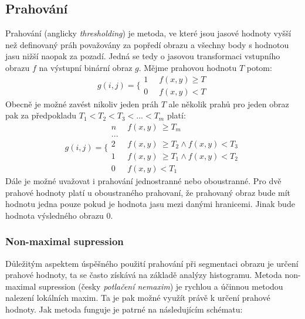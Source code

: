 \documentclass{thesis}%
\begin{document}
\subsection{Prahování}
Prahování (anglicky \textit{thresholding}) je metoda, ve které jsou jasové hodnoty vyšší než definovaný práh považovány za popředí obrazu a všechny body s hodnotou jasu nižší naopak za pozadí. Jedná se tedy o jasovou transformaci vstupního obrazu $f$ na výstupní binární obraz $g$. Mějme prahovou hodnotu $T$ potom:
\begin{equation}
g(i, j) = \bigg\{ 
\begin{matrix}
1\;&\;f(x,y)\geq T\\
0\;&\;f(x,y)< T
\end{matrix}
\end{equation}
Obecně je možné zavést nikoliv jeden práh $T$ ale několik prahů pro jeden obraz pak za předpokladu $T_1<T_2<T_3<...<T_m$ platí:
\begin{equation}
g(i, j) = \Bigg\{ 
\begin{matrix}
n\;&\;f(x,y)\ \geq T_m \\
... &\;\\
2\;&\;f(x,y)\ \geq T_2 \wedge f(x,y) < T_3 \\
1\;&\;f(x,y)\ \geq T_1 \wedge f(x,y) < T_2 \\
0\;&\;f(x,y)< T_1
\end{matrix}
\end{equation}
Dále je možné uvažovat i prahování jednostranné nebo oboustranné. Pro dvě prahové hodnoty platí u oboustraného prahovaní, že prahovaný obraz bude mít hodnotu jedna pouze pokud je hodnota jasu mezi danými hranicemi. Jinak bude hodnota výsledného obrazu 0.\\
\subsubsection{Non-maximal supression} \label{nonMaxSup}
Důležitým aspektem úspěšného použití prahování při segmentaci obrazu je určení prahové hodnoty, ta se často získává na základě analýzy histogramu. Metoda non-maximal supression (česky \textit{potlačení nemaxim}) je rychlou a účinnou metodou nalezení lokálních maxim. Ta je pak možné využít právě k určení prahové hodnoty. Jak metoda funguje je patrné na následujícím schématu:
\end{document}
